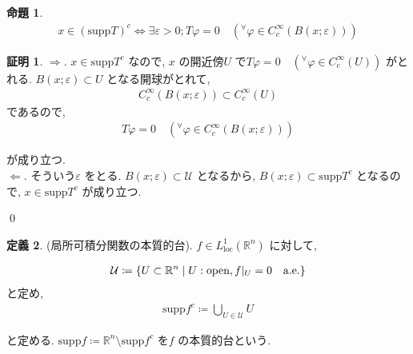 \documentclass[10pt, fleqn, label-section=none]{bxjsarticle}
\theoremstyle{definition}
\newtheorem{dfn}{定義}[section]
\newtheorem{prop}[dfn]{命題}
\newtheorem*{pf*}{証明}
\newcommand{\any}{{}^{\forall}}
\newcommand{\veps}{\varepsilon}
\newcommand{\cbra}[1]{\mleft\{#1\mright\}}
\newcommand{\LR}{\Leftrightarrow}
\newcommand{\naraba}{\Rightarrow}
\newcommand{\gyaku}{\Leftarrow}
\newcommand{\supp}{\textrm{supp}}
\renewcommand{\;}{\, ; \,}
\begin{document}
\begin{prop}

\begin{align*} x \in (\supp T)^c \LR \exists \veps > 0 ; T\varphi = 0 \quad (\any \varphi \in C_c^\infty (B(x;\veps))) \end{align*}

\end{prop}
\begin{pf*}$\naraba$.  $x \in \supp T^c$ なので, $x$ の開近傍$U $ で$T \varphi = 0 \quad (\any \varphi \in C_c^\infty (U))$ がとれる. $B(x; \veps ) \subset U$ となる開球がとれて, 
\begin{align*} C_c^\infty (B(x; \veps) ) \subset C_c^\infty (U) \end{align*}
であるので, 
\begin{align*} T \varphi = 0 \quad (\any \varphi \in  C_c^\infty (B(x; \veps) )  ) \end{align*}

が成り立つ. \\
$\gyaku$. そういう$\veps$ をとる. $B(x; \veps) \subset \mathcal U$ となるから, $B(x; \veps) \subset \supp T ^c $ となるので, $x \in \supp T^c$ が成り立つ. 

\qed
\end{pf*}


\begin{dfn}(局所可積分関数の本質的台). $f \in L_{\textrm{loc}}^1(\mathbb R^n)$ に対して, 

\begin{align*} \mathcal U \coloneqq \cbra{U \subset \mathbb R^n \mid U:\textrm{open},  f|_U = 0\quad \textrm{a.e.} }  \end{align*}
と定め, 
\begin{align*} \supp f ^c \coloneqq \bigcup_{U \in \mathcal U} U   \end{align*}

と定める. $\supp f \coloneqq \mathbb R^n \setminus \supp f ^c$ を$f$ の本質的台という. 

\end{dfn}
\end{document}
